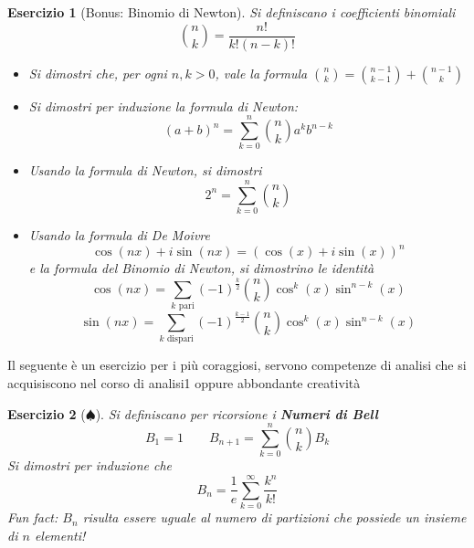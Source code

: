 \documentclass{article}
\newtheorem{es}{Esercizio}
\begin{document}
{\begin{es}[Bonus: Binomio di Newton]
    Si definiscano i coefficienti binomiali
    $$\binom{n}{k}=\frac{n!}{k!(n-k)!}$$
    \begin{itemize}
        \item Si dimostri che, per ogni $n,k>0$, vale la formula $\binom{n}{k}=\binom{n-1}{k-1}+\binom{n-1}{k}$
        \item Si dimostri per induzione la formula di Newton:
        $$(a+b)^n=\sum_{k=0}^n \binom{n}{k}a^kb^{n-k}$$
        \item Usando la formula di Newton, si dimostri $$2^n=\sum_{k=0}^n \binom{n}{k}$$
        \item Usando la formula di De Moivre
        $$\cos (nx) + i \sin(nx)=(\cos(x)+i\sin(x))^n$$
        e la formula del Binomio di Newton, si dimostrino le identità
        $$\cos(nx)=\sum_{k\text{ pari}} (-1)^{\frac{k}{2}}\binom{n}{k}\cos^{k}(x)\sin^{n-k}(x)$$
        $$\sin(nx)=\sum_{k\text{ dispari}} (-1)^{\frac{k-1}{2}}\binom{n}{k}\cos^{k}(x)\sin^{n-k}(x)$$
    \end{itemize}
\end{es}



Il seguente è un esercizio per i più coraggiosi, servono competenze di analisi che si acquisiscono nel corso di analisi1 oppure abbondante creatività

\begin{es}[$\spadesuit$]
    Si definiscano per ricorsione i \textbf{Numeri di Bell}
    $$B_1=1\qquad B_{n+1}=\sum_{k=0}^n\binom{n}{k}B_k$$
    Si dimostri per induzione che $$B_n=\frac{1}{e}\sum_{k=0}^\infty \frac{k^n}{k!}$$
    Fun fact: $B_n$ risulta essere uguale al numero di partizioni che possiede un insieme di $n$ elementi!
\end{es}



\newpage
}
\end{document}
